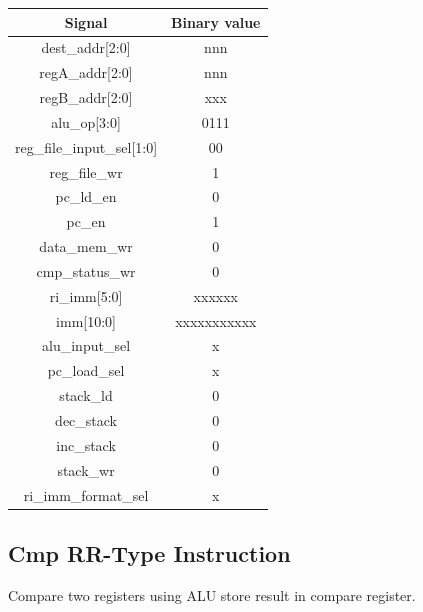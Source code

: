 \documentclass{article}
\begin{document}
\begin{par}
	\begin{center}
		\begin{tabular}{|c|c|}
			\hline 
			\textbf{Signal} & \textbf{Binary value} \\ 
			\hline 
			dest\_addr[2:0] & nnn \\ 
			\hline 
			regA\_addr[2:0] & nnn \\ 
			\hline 
			regB\_addr[2:0] & xxx \\ 
			\hline 
			alu\_op[3:0] & 0111 \\ 
			\hline 
			reg\_file\_input\_sel[1:0] & 00 \\ 
			\hline 
			reg\_file\_wr & 1 \\ 
			\hline 
			pc\_ld\_en & 0 \\ 
			\hline 
			pc\_en & 1 \\ 
			\hline 
			data\_mem\_wr & 0 \\ 
			\hline 
			cmp\_status\_wr & 0 \\ 
			\hline 
			ri\_imm[5:0] & xxxxxx \\ 
			\hline 
			imm[10:0] & xxxxxxxxxxx \\ 
			\hline 
			alu\_input\_sel & x \\ 
			\hline 
			pc\_load\_sel & x \\ 
			\hline 
			stack\_ld & 0 \\ 
			\hline 
			dec\_stack & 0 \\ 
			\hline 
			inc\_stack & 0 \\ 
			\hline 
			stack\_wr & 0 \\ 
			\hline 
			ri\_imm\_format\_sel & x \\ 
			\hline 
		\end{tabular} 
	\end{center}

	\newpage
	\subsection{Cmp RR-Type Instruction}
	
	Compare two registers using ALU store result in compare register. 
	

\end{par}
\end{document}

